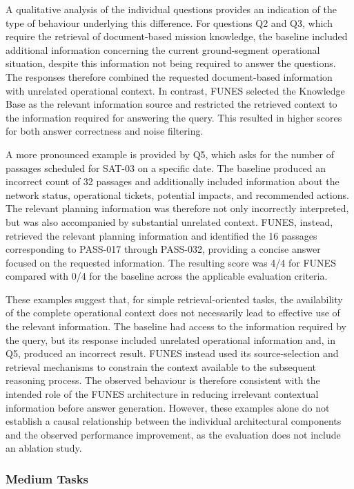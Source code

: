 A qualitative analysis of the individual questions provides an indication of the type of behaviour underlying this difference. For questions Q2 and Q3, which require the retrieval of document-based mission knowledge, the baseline included additional information concerning the current ground-segment operational situation, despite this information not being required to answer the questions. The responses therefore combined the requested document-based information with unrelated operational context. In contrast, FUNES selected the Knowledge Base as the relevant information source and restricted the retrieved context to the information required for answering the query. This resulted in higher scores for both answer correctness and noise filtering.

A more pronounced example is provided by Q5, which asks for the number of passages scheduled for SAT-03 on a specific date. The baseline produced an incorrect count of 32 passages and additionally included information about the network status, operational tickets, potential impacts, and recommended actions. The relevant planning information was therefore not only incorrectly interpreted, but was also accompanied by substantial unrelated context. FUNES, instead, retrieved the relevant planning information and identified the 16 passages corresponding to PASS-017 through PASS-032, providing a concise answer focused on the requested information. The resulting score was 4/4 for FUNES compared with 0/4 for the baseline across the applicable evaluation criteria.

These examples suggest that, for simple retrieval-oriented tasks, the availability of the complete operational context does not necessarily lead to effective use of the relevant information. The baseline had access to the information required by the query, but its response included unrelated operational information and, in Q5, produced an incorrect result. FUNES instead used its source-selection and retrieval mechanisms to constrain the context available to the subsequent reasoning process. The observed behaviour is therefore consistent with the intended role of the FUNES architecture in reducing irrelevant contextual information before answer generation. However, these examples alone do not establish a causal relationship between the individual architectural components and the observed performance improvement, as the evaluation does not include an ablation study.



\subsubsection{Medium Tasks}

